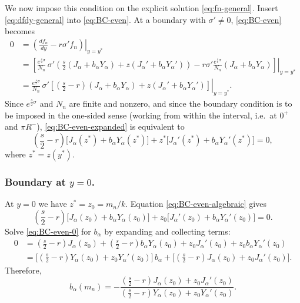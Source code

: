 \documentclass[11pt]{article}
\begin{document}
We now impose this condition on the explicit solution \eqref{eq:fn-general}.
Insert \eqref{eq:dfdy-general} into \eqref{eq:BC-even}. At a boundary with $\sigma'\neq 0$,
\eqref{eq:BC-even} becomes
\begin{align}
0
&=\left.\left(\frac{df_n}{dy}-r\sigma' f_n\right)\right|_{y=y^\ast}
\nonumber\\[4pt]
&=\left.\left[
\frac{e^{\frac{s}{2}\sigma}}{N_n}\,\sigma'\left(
\frac{s}{2}(J_\alpha+b_\alpha Y_\alpha)+z(J_\alpha'+b_\alpha Y_\alpha')
\right)
-r\sigma'\frac{e^{\frac{s}{2}\sigma}}{N_n}(J_\alpha+b_\alpha Y_\alpha)
\right]\right|_{y=y^\ast}
\nonumber\\[4pt]
&=\left.\frac{e^{\frac{s}{2}\sigma}}{N_n}\,\sigma'\left[
\left(\frac{s}{2}-r\right)(J_\alpha+b_\alpha Y_\alpha)+z(J_\alpha'+b_\alpha Y_\alpha')
\right]\right|_{y=y^\ast}.
\label{eq:BC-even-expanded}
\end{align}
Since $e^{\frac{s}{2}\sigma}$ and $N_n$ are finite and nonzero, and since the boundary condition is
to be imposed in the one-sided sense (working from within the interval, i.e.\ at $0^+$ and $\pi R^-$),
\eqref{eq:BC-even-expanded} is equivalent to
\begin{equation}
\left(\frac{s}{2}-r\right)\Big[J_\alpha(z^\ast)+b_\alpha Y_\alpha(z^\ast)\Big]
+z^\ast\Big[J_\alpha'(z^\ast)+b_\alpha Y_\alpha'(z^\ast)\Big]=0,
\label{eq:BC-even-algebraic}
\end{equation}
where $z^\ast=z(y^\ast)$.

\subsubsection*{Boundary at $y=0$.}
At $y=0$ we have $z^\ast=z_0=m_n/k$. Equation \eqref{eq:BC-even-algebraic} gives
\begin{equation}
\left(\frac{s}{2}-r\right)\Big[J_\alpha(z_0)+b_\alpha Y_\alpha(z_0)\Big]
+z_0\Big[J_\alpha'(z_0)+b_\alpha Y_\alpha'(z_0)\Big]=0.
\label{eq:BC-even-0}
\end{equation}
Solve \eqref{eq:BC-even-0} for $b_\alpha$ by expanding and collecting terms:
\begin{align}
0
&=\left(\frac{s}{2}-r\right)J_\alpha(z_0)+\left(\frac{s}{2}-r\right)b_\alpha Y_\alpha(z_0)
+z_0 J_\alpha'(z_0)+z_0 b_\alpha Y_\alpha'(z_0)
\nonumber\\[4pt]
&=\Big[\left(\frac{s}{2}-r\right)Y_\alpha(z_0)+z_0 Y_\alpha'(z_0)\Big]\,b_\alpha
+\Big[\left(\frac{s}{2}-r\right)J_\alpha(z_0)+z_0 J_\alpha'(z_0)\Big].
\label{eq:collect-b}
\end{align}
Therefore,
\begin{equation}
b_\alpha(m_n)
=-
\frac{\left(\frac{s}{2}-r\right)J_\alpha(z_0)+z_0 J_\alpha'(z_0)}
{\left(\frac{s}{2}-r\right)Y_\alpha(z_0)+z_0 Y_\alpha'(z_0)}.
\label{eq:b-even-at-0}
\end{equation}
\end{document}
